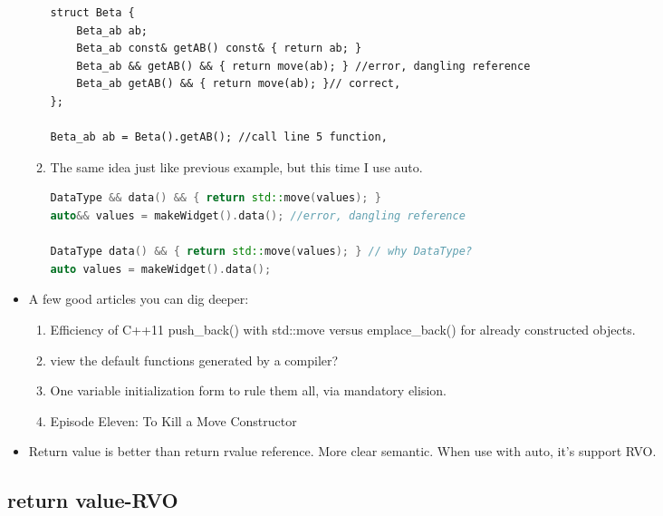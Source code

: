 \documentclass[a4paper,11pt,twoside]{book}
\begin{document}
\begin{itemize}
\begin{enumerate}
\begin{lstlisting}
struct Beta {
	Beta_ab ab;
	Beta_ab const& getAB() const& { return ab; }
	Beta_ab && getAB() && { return move(ab); } //error, dangling reference
	Beta_ab getAB() && { return move(ab); }// correct, 
};

Beta_ab ab = Beta().getAB(); //call line 5 function, 
\end{lstlisting}

			\item The same idea just like previous example, but this time I use auto.
\begin{lstlisting}[frame=single, language=c++]
DataType && data() && { return std::move(values); }
auto&& values = makeWidget().data(); //error, dangling reference

DataType data() && { return std::move(values); } // why DataType?
auto values = makeWidget().data();
\end{lstlisting}

	\end{enumerate}

	\item A few good articles you can dig deeper:
	\begin{enumerate}
		\item Efficiency of C++11 push\_back() with std::move versus emplace\_back() for already constructed objects.
		\item view the default functions generated by a compiler?
		\item One variable initialization form to rule them all, via mandatory elision.
		\item Episode Eleven: To Kill a Move Constructor
	\end{enumerate}

	\item Return value is better than return rvalue reference.  More clear semantic. When use with auto, it's support RVO. 

\end{itemize}

\subsection{return value-RVO}
\end{document}
